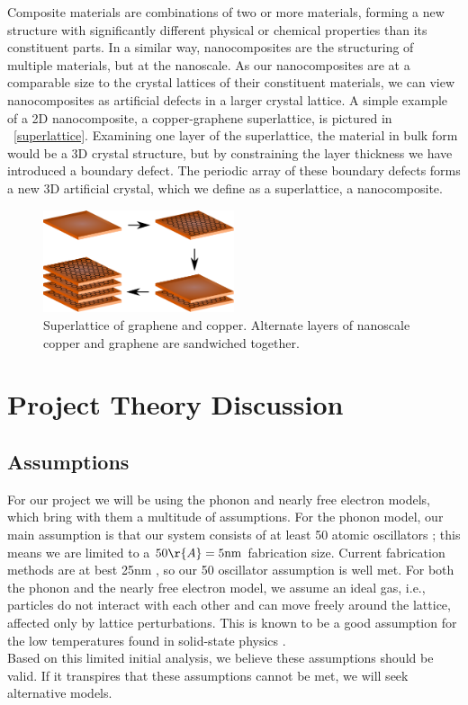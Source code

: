 \documentclass[a4paper,10pt,journal]{IEEEtran}
\newcommand{\figref}[2][\figurename~]{#1\ref{#2}}
\begin{document}
Composite materials are combinations of two or more materials, forming a new structure with significantly different physical or chemical properties than its constituent parts. In a similar way, nanocomposites are the structuring of multiple materials, but at the nanoscale. As our nanocomposites are at a comparable size to the crystal lattices of their constituent materials, we can view
nanocomposites as artificial defects in a larger crystal lattice. A
simple example of a 2D nanocomposite, a copper-graphene superlattice,
is pictured in \figref{superlattice}. Examining one layer of the
superlattice, the material in bulk form would be a 3D crystal structure,
but by constraining the layer thickness we have introduced a boundary
defect. The periodic array of these boundary defects forms a new 3D
artificial crystal, which we define as a superlattice, a nanocomposite.

\begin{figure}
	\centering
	\includegraphics[width=0.5\textwidth]{graphene-superlattice.eps}
	\caption{Superlattice of graphene and copper. Alternate layers of
	nanoscale copper and graphene are sandwiched together.}
\end{figure}

\section{Project Theory Discussion}
\label{project-discussion}
\subsection{Assumptions}
For our project we will be using the phonon and nearly free electron models, which
bring with them a multitude of assumptions. For the phonon model, our
main assumption is that our system consists of at least 50 atomic oscillators
\cite{kittel}; this means we are limited to a $50\r{A} = 5
\mathrm{nm}$ fabrication size. Current fabrication methods are at best
25nm \cite{minnich-review}, so our 50 oscillator assumption is well met.
For both the phonon and the nearly free electron model, we assume an ideal gas,
i.e., particles do not interact with each other and can move freely
around the lattice, affected only by lattice perturbations. This is
known to be a good assumption for the low temperatures found in solid-state physics
\cite{kittel}.\\
Based on this limited initial analysis, we believe these assumptions
should be valid. If it transpires that these assumptions cannot be met, we will seek alternative models.\\
\end{document}

